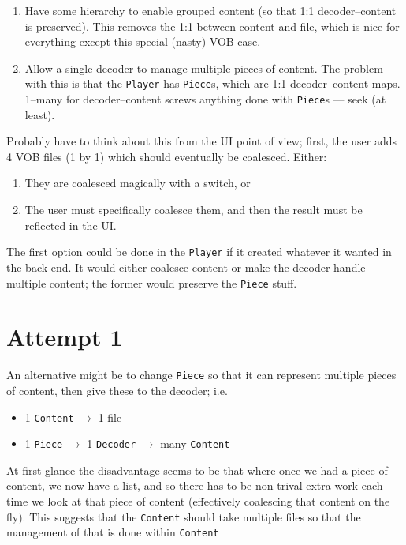 \documentclass{article}
\begin{document}
\begin{enumerate}
\item Have some hierarchy to enable grouped content (so that 1:1
  decoder--content is preserved).  This removes the 1:1 between
  content and file, which is nice for everything except this
  special (nasty) VOB case.
\item Allow a single decoder to manage multiple pieces of content.
  The problem with this is that the \texttt{Player} has
  \texttt{Piece}s, which are 1:1 decoder--content maps.  1--many for
  decoder--content screws anything done with \texttt{Piece}s --- seek
  (at least).
\end{enumerate}

Probably have to think about this from the UI point of view; first,
the user adds 4 VOB files (1 by 1) which should eventually be
coalesced.  Either:

\begin{enumerate}
\item They are coalesced magically with a switch, or
\item The user must specifically coalesce them, and then the result
  must be reflected in the UI.
\end{enumerate}

The first option could be done in the \texttt{Player} if it created
whatever it wanted in the back-end.  It would either coalesce content
or make the decoder handle multiple content; the former would preserve
the \texttt{Piece} stuff.


\section{Attempt 1}

An alternative might be to change \texttt{Piece} so that it can
represent multiple pieces of content, then give these to the decoder; i.e.

\begin{itemize}
\item 1 \texttt{Content} $\to$ 1 file
\item 1 \texttt{Piece} $\to$ 1 \texttt{Decoder} $\to$ many \texttt{Content}
\end{itemize}

At first glance the disadvantage seems to be that where once we had a
piece of content, we now have a list, and so there has to be
non-trival extra work each time we look at that piece of content
(effectively coalescing that content on the fly).  This suggests that
the \texttt{Content} should take multiple files so that the management
of that is done within \texttt{Content}
\end{document}
